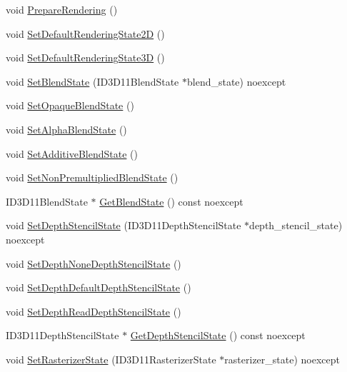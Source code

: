\begin{DoxyCompactItemize}
void \hyperlink{structmage_1_1_rendering_state_ac685d7f5b0832bc4af9e09ed3f50bf22}{Prepare\+Rendering} ()
\item 
void \hyperlink{structmage_1_1_rendering_state_aa8279c1177941c8f14502fc9c7296655}{Set\+Default\+Rendering\+State2D} ()
\item 
void \hyperlink{structmage_1_1_rendering_state_ac6029d9fdc873317b97f60d59b88e7a7}{Set\+Default\+Rendering\+State3D} ()
\item 
void \hyperlink{structmage_1_1_rendering_state_aa91119e7704856c097adb20b6080a26e}{Set\+Blend\+State} (I\+D3\+D11\+Blend\+State $\ast$blend\+\_\+state) noexcept
\item 
void \hyperlink{structmage_1_1_rendering_state_ab0f578405f3c880234757e152be1a670}{Set\+Opaque\+Blend\+State} ()
\item 
void \hyperlink{structmage_1_1_rendering_state_a7f97752f22b0a32912f24d16c1aa2441}{Set\+Alpha\+Blend\+State} ()
\item 
void \hyperlink{structmage_1_1_rendering_state_a61341d0fc7f1140faaf8fb33f9bb13fb}{Set\+Additive\+Blend\+State} ()
\item 
void \hyperlink{structmage_1_1_rendering_state_acf313a797964e3a86dde2799a42f2db3}{Set\+Non\+Premultiplied\+Blend\+State} ()
\item 
I\+D3\+D11\+Blend\+State $\ast$ \hyperlink{structmage_1_1_rendering_state_ac1a0e8f7ba3865eaf0ec8445664a6a43}{Get\+Blend\+State} () const noexcept
\item 
void \hyperlink{structmage_1_1_rendering_state_ad6081a1d840e30f58a8090f80e59b8fe}{Set\+Depth\+Stencil\+State} (I\+D3\+D11\+Depth\+Stencil\+State $\ast$depth\+\_\+stencil\+\_\+state) noexcept
\item 
void \hyperlink{structmage_1_1_rendering_state_a67db088d08560ab5f3adde28032972a4}{Set\+Depth\+None\+Depth\+Stencil\+State} ()
\item 
void \hyperlink{structmage_1_1_rendering_state_a88933420c94d4127973d8148ccd97e86}{Set\+Depth\+Default\+Depth\+Stencil\+State} ()
\item 
void \hyperlink{structmage_1_1_rendering_state_a86ff2bb5739ada7ffcc275f4624d2a24}{Set\+Depth\+Read\+Depth\+Stencil\+State} ()
\item 
I\+D3\+D11\+Depth\+Stencil\+State $\ast$ \hyperlink{structmage_1_1_rendering_state_a8a11db948fdf3c84bf55346877fcc020}{Get\+Depth\+Stencil\+State} () const noexcept
\item 
void \hyperlink{structmage_1_1_rendering_state_a44d2892e59966697e79b80eb0cd847f7}{Set\+Rasterizer\+State} (I\+D3\+D11\+Rasterizer\+State $\ast$rasterizer\+\_\+state) noexcept

\end{DoxyCompactItemize}
